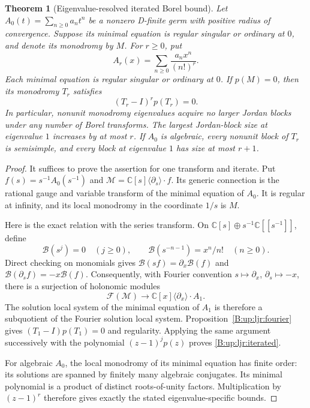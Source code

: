 \documentclass[11pt,a4paper]{article}
\newtheorem{theorem}{Theorem}[section]
\theoremstyle{definition}
\theoremstyle{remark}
\numberwithin{equation}{section}
\begin{document}
\begin{theorem}[Eigenvalue-resolved iterated Borel bound]\label{B:up:borel-bound}
Let $A_0(t)=\sum_{n\ge0}a_nt^n$ be a nonzero D-finite germ with
positive radius of convergence. Suppose its minimal equation is
regular singular or ordinary at $0$, and denote its monodromy by
$M$. For $r\ge0$, put
\[
                  A_r(x)=\sum_{n\ge0}\frac{a_nx^n}{(n!)^r}.
\]
Each minimal equation is regular singular or ordinary at $0$.
If $p(M)=0$, then its monodromy $T_r$ satisfies
\begin{equation}\label{B:up:ljr:iterated}
                      (T_r-I)^r p(T_r)=0.
\end{equation}
In particular, nonunit monodromy eigenvalues acquire no larger
Jordan blocks under any number of Borel transforms. The largest
Jordan-block size at eigenvalue $1$ increases by at most $r$.
If $A_0$ is algebraic, every nonunit block of $T_r$ is semisimple,
and every block at eigenvalue $1$ has size at most $r+1$.
\end{theorem}
\begin{proof}
It suffices to prove the assertion for one transform and iterate.
Put $f(s)=s^{-1}A_0(s^{-1})$ and
$\mathcal M=\mathbb C[s]\langle\partial_s\rangle\cdot f$.
Its generic connection is the rational gauge and variable transform
of the minimal equation of $A_0$.  It is regular at infinity, and
its local monodromy in the coordinate $1/s$ is $M$.

Here is the exact relation with the series transform. On
$\mathbb C[s]\oplus s^{-1}\mathbb C[[s^{-1}]]$, define
\[
 \mathcal B(s^j)=0\quad(j\ge0),\qquad
 \mathcal B(s^{-n-1})=x^n/n!\quad(n\ge0).
\]
Direct checking on monomials gives
$\mathcal B(sf)=\partial_x\mathcal B(f)$ and
$\mathcal B(\partial_sf)=-x\mathcal B(f)$.
Consequently, with Fourier convention
$s\mapsto\partial_x$, $\partial_s\mapsto-x$, there is a
surjection of holonomic modules
\[
                   \mathcal F(\mathcal M)
                       \longrightarrow
                   \mathbb C[x]\langle\partial_x\rangle\cdot A_1.
\]
The solution local system of the minimal equation of $A_1$ is
therefore a subquotient of the Fourier solution local system.
Proposition~\ref{B:up:ljr:fourier} gives $(T_1-I)p(T_1)=0$ and
regularity. Applying the same argument successively with the
polynomial $(z-1)^j p(z)$ proves \eqref{B:up:ljr:iterated}.

For algebraic $A_0$, the local monodromy of its minimal equation
has finite order: its solutions are spanned by finitely many
algebraic conjugates. Its minimal polynomial is a product of
distinct roots-of-unity factors. Multiplication by $(z-1)^r$
therefore gives exactly the stated eigenvalue-specific bounds.
\end{proof}
\end{document}
